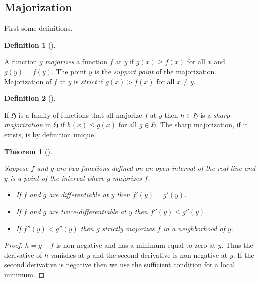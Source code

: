 \documentclass[
  12pt,
  letterpaper,
  DIV=11,
  numbers=noendperiod]{scrartcl}
\providecommand{\tightlist}{%
  \setlength{\itemsep}{0pt}\setlength{\parskip}{0pt}}\usepackage{longtable,booktabs,array}
\theoremstyle{definition}
\newtheorem{definition}{Definition}[section]
\theoremstyle{plain}
\newtheorem{theorem}{Theorem}[section]
\theoremstyle{plain}
\theoremstyle{remark}
\begin{document}
\subsection{Majorization}\label{majorization}

First some definitions.

\begin{definition}[]\protect\hypertarget{def-majorize}{}\label{def-majorize}

A function \(g\) \emph{majorizes} a function \(f\) at \(y\) if
\(g(x)\geq f(x)\) for all \(x\) and \(g(y)=f(y)\). The point \(y\) is
the \emph{support point} of the majorization. Majorization of \(f\) at
\(y\) is \emph{strict} if \(g(x)>f(x)\) for all \(x\not= y\).

\end{definition}

\begin{definition}[]\protect\hypertarget{def-sharp}{}\label{def-sharp}

If \(\mathfrak{H}\) is a family of functions that all majorize \(f\) at
\(y\) then \(h\in\mathfrak{H}\) is a \emph{sharp majorization} in
\(\mathfrak{H}\) if \(h(x)\leq g(x)\) for all \(g\in\mathfrak{H}\). The
sharp majorization, if it exists, is by definition unique.

\end{definition}

\begin{theorem}[]\protect\hypertarget{thm-diff}{}\label{thm-diff}

Suppose \(f\) and \(g\) are two functions defined on an open interval of
the real line and \(y\) is a point of the interval where \(g\) majorizes
\(f\).

\begin{itemize}
\tightlist
\item
  If \(f\) and \(g\) are differentiable at \(y\) then \(f'(y)=g'(y)\).
\item
  If \(f\) and \(g\) are twice-differentiable at \(y\) then
  \(f''(y)\leq g''(y)\).
\item
  If \(f''(y)<g''(y)\) then \(g\) strictly majorizes \(f\) in a
  neighborhood of \(y\).
\end{itemize}

\end{theorem}

\begin{proof}
\(h=g-f\) is non-negative and has a minimum equal to zero at \(y\). Thus
the derivative of \(h\) vanishes at \(y\) and the second derivative is
non-negative at \(y\). If the second derivative is negative then we use
the sufficient condition for a local minimum.
\end{proof}
\end{document}

